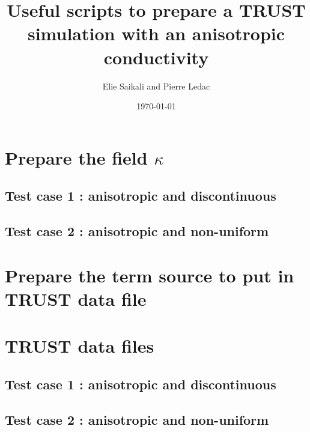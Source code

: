 \documentclass{article}
\begin{document}
 	\title{Useful scripts to prepare a TRUST simulation with an anisotropic conductivity}
 	\author{Elie Saikali and Pierre Ledac}
	\date{\today}

	\maketitle

	\section{Prepare the field $\kappa$}
	\subsection{Test case 1 : anisotropic and discontinuous}
	

	\subsection{Test case 2 : anisotropic and non-uniform}
	

	\section{Prepare the term source to put in TRUST data file}
	

	\section{TRUST data files}
	\subsection{Test case 1 : anisotropic and discontinuous}
	

	\subsection{Test case 2 : anisotropic and non-uniform}
	
\end{document}
